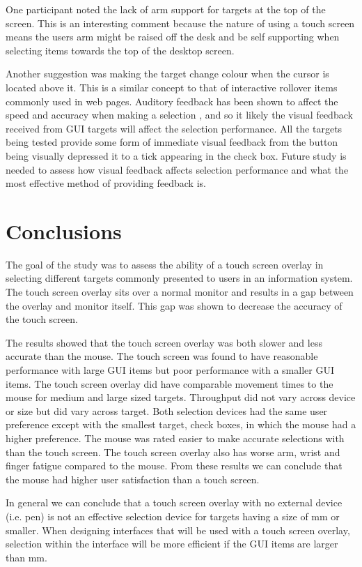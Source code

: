 \documentclass{elsart}
\begin{document}
One participant noted the lack of arm support for targets at the top of
the screen. This is an interesting comment because the nature of using a
touch screen means the users arm might be raised off the desk and be
self supporting when selecting items towards the top of the desktop
screen.

Another suggestion was making the target change colour when the cursor
is located above it. This is a similar concept to that of interactive
rollover items commonly used in web pages. Auditory feedback has been
shown to affect the speed and accuracy when making a selection
\citep{Bend-G-1999-PhD}, and so it likely the visual feedback received
from GUI targets will affect the selection performance. All the targets
being tested provide some form of immediate visual feedback from the
button being visually depressed it to a tick appearing in the check box.
Future study is needed to assess how visual feedback affects selection
performance and what the most effective method of providing feedback is.

\section{Conclusions}
\label{sec-conclusions}

The goal of the study was to assess the ability of a touch screen
overlay in selecting different targets commonly presented to users in an
information system. The touch screen overlay sits over a normal monitor
and results in a gap between the overlay and monitor itself. This gap
was shown to decrease the accuracy of the touch screen.

The results showed that the touch screen overlay was both slower and
less accurate than the mouse. The touch screen was found to have
reasonable performance with large GUI items but poor performance with a
smaller GUI items. The touch screen overlay did have comparable movement
times to the mouse for medium and large sized targets. Throughput did
not vary across device or size but did vary across target. Both
selection devices had the same user preference except with the smallest
target, check boxes, in which the mouse had a higher preference. The
mouse was rated easier to make accurate selections with than the touch
screen. The touch screen overlay also has worse arm, wrist and finger
fatigue compared to the mouse. From these results we can conclude that
the mouse had higher user satisfaction than a touch screen.

In general we can conclude that a touch screen overlay with no external
device (i.e. pen) is not an effective selection device for targets
having a size of \unit[4]{mm} or smaller. When designing interfaces that
will be used with a touch screen overlay, selection within the interface
will be more efficient if the GUI items are larger than \unit[4]{mm}.
\end{document}
